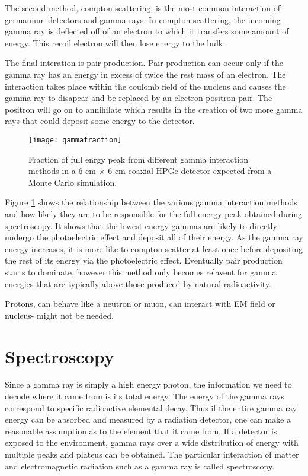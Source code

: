 The second method, compton scattering, is the most common interaction of germanium detectors and gamma rays.
In compton scattering, the incoming gamma ray is deflected off of an electron to which it transfers some amount of energy.
This recoil electron will then lose energy to the bulk.

The final interation is pair production.
Pair production can occur only if the gamma ray has an energy in excess of twice the rest mass of an electron.
The interaction takes place within the coulomb field of the nucleus and causes the gamma ray to disapear and be replaced by an electron positron pair.
The positron will go on to annihilate which results in the creation of two more gamma rays that could deposit some energy to the detector.
\begin{figure}[htpb]
\centering
\texttt{[image: gammafraction]}
  \caption{Fraction of full enrgy peak from different gamma interaction methods in a 6 cm $\times$ 6 cm coaxial HPGe detector expected from a Monte Carlo simulation. \cite{Roth1984SegmentationAP}}
\label{fig:gammafraction}
\end{figure}
Figure \ref{fig:gammafraction} shows the relationship between the various gamma interaction methods and how likely they are to be responsible for the full energy peak obtained during spectroscopy.
It shows that the lowest energy gammas are likely to directly undergo the photoelectric effect and deposit all of their energy.
As the gamma ray energy increases, it is more like to compton scatter at least once before depositing the rest of its energy via the photoelectric effect.
Eventually pair production starts to dominate, however this method only becomes relavent for gamma energies that are typically above those produced by natural radioactivity.

Protons, can behave like a neutron or muon, can interact with EM field or nucleus- might not be needed.

\section{Spectroscopy}
Since a gamma ray is simply a high energy photon, the information we need to decode where it came from is its total energy.
The energy of the gamma rays correspond to specific radioactive elemental decay.
Thus if the entire gamma ray energy can be absorbed and measured by a radiation detector, one can make a reasonable assumption as to the element that it came from.
If a detector is exposed to the environment, gamma rays over a wide distribution of energy with multiple peaks and plateus can be obtained.
The particular interaction of matter and electromagnetic radiation such as a gamma ray is called spectroscopy.

